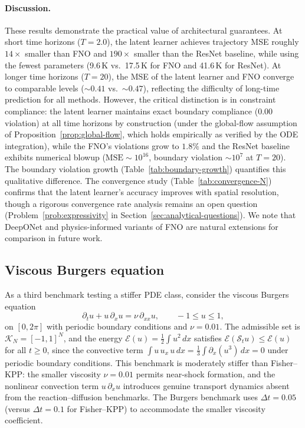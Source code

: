 \documentclass[11pt]{article}
\newcommand{\cS}{\mathcal{S}}
\newcommand{\cK}{\mathcal{K}}
\newcommand{\cE}{\mathcal{E}}
\begin{document}
\paragraph{Discussion.}
These results demonstrate the practical value of architectural guarantees. At short time horizons ($T=2.0$), the latent learner achieves trajectory MSE roughly $14\times$ smaller than FNO and $190\times$ smaller than the ResNet baseline, while using the fewest parameters (9.6\,K vs.\ 17.5\,K for FNO and 41.6\,K for ResNet). At longer time horizons ($T=20$), the MSE of the latent learner and FNO converge to comparable levels ($\sim 0.41$ vs.\ $\sim 0.47$), reflecting the difficulty of long-time prediction for all methods. However, the critical distinction is in constraint compliance: the latent learner maintains exact boundary compliance ($0.00$ violation) at all time horizons by construction (under the global-flow assumption of Proposition~\ref{prop:global-flow}, which holds empirically as verified by the ODE integration), while the FNO's violations grow to $1.8\%$ and the ResNet baseline exhibits numerical blowup ($\mathrm{MSE}\sim 10^{16}$, boundary violation $\sim 10^{7}$ at $T=20$). The boundary violation growth (Table~\ref{tab:boundary-growth}) quantifies this qualitative difference. The convergence study (Table~\ref{tab:convergence-N}) confirms that the latent learner's accuracy improves with spatial resolution, though a rigorous convergence rate analysis remains an open question (Problem~\ref{prob:expressivity} in Section~\ref{sec:analytical-questions}). We note that DeepONet and physics-informed variants of FNO are natural extensions for comparison in future work.

\subsection{Viscous Burgers equation}\label{subsec:burgers}
As a third benchmark testing a stiffer PDE class, consider the viscous Burgers equation
\begin{equation}\label{eq:burgers-bench}
\partial_t u + u\,\partial_x u = \nu\,\partial_{xx} u, \qquad -1\le u\le 1,
\end{equation}
on $[0,2\pi]$ with periodic boundary conditions and $\nu=0.01$. The admissible set is $\cK_N=[-1,1]^N$, and the energy $\cE(u)=\frac{1}{2}\int u^2\,dx$ satisfies $\cE(\cS_t u)\le \cE(u)$ for all $t\ge 0$, since the convective term $\int u\,u_x\,u\,dx=\frac{1}{3}\int \partial_x(u^3)\,dx=0$ under periodic boundary conditions. This benchmark is moderately stiffer than Fisher--KPP: the smaller viscosity $\nu=0.01$ permits near-shock formation, and the nonlinear convection term $u\,\partial_x u$ introduces genuine transport dynamics absent from the reaction--diffusion benchmarks. The Burgers benchmark uses $\Delta t=0.05$ (versus $\Delta t=0.1$ for Fisher--KPP) to accommodate the smaller viscosity coefficient.
\end{document}
